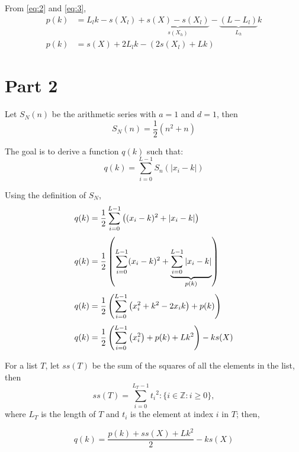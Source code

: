 \documentclass[11pt]{article}
\begin{document}
From \eqref{eq:2} and \eqref{eq:3},
\begin{align}
    p(k) & = {
    L_l k - s(X_l) +
    \underbrace{s(X) - s(X_l)}_{s(X_h)} -
    \underbrace{(L - L_l)}_{L_h} k
    } \nonumber \\
    p(k) & =  {
    s(X) + 2 L_l k - (2 s(X_l) + L k)
    \tag{P} \label{eq:p}
    }
\end{align}

\newpage

\section*{Part 2}

Let \(S_N(n)\) be the arithmetic series with \(a = 1\) and \(d = 1\), then
\begin{equation*}
    S_N(n) = \frac{1}{2} \left({n^2 + n}\right)
\end{equation*}


The goal is to derive a function \(q(k)\) such that:
\begin{equation*}
    q(k) = \sum_{i = 0}^{L - 1} S_n(|x_i - k|)
\end{equation*}

Using the definition of \(S_N\),
\begin{equation*}
    \setlength{\jot}{0.5\baselineskip}
    \begin{aligned}
        q(k) & = \frac{1}{2} \sum_{i = 0}^{L - 1}
        \left({(x_i - k)^2 + |x_i - k|}\right)    \\
        q(k) & = \frac{1}{2} \left({
            \sum_{i = 0}^{L - 1} (x_i - k)^2 +
            \underbrace{
                \sum_{i = 0}^{L - 1} |x_i - k|
            }_{p(k)}
        }\right)                                  \\
        q(k) & = \frac{1}{2} \left({
                    \sum_{i = 0}^{L - 1} \left({x_i^2 + k^2 - 2 x_i k}\right) +
                    p(k)
        }\right)                                  \\
        q(k) & = \frac{1}{2} \left({
                    \sum_{i = 0}^{L - 1} \left({x_i^2}\right) +
                    p(k) + L k^2
                }\right) - k s(X)
    \end{aligned}
\end{equation*}

For a list \(T\), let \(ss(T)\) be the sum of the squares of all the elements
in the list, then
\begin{equation*}
    ss(T) = {
    \sum_{i = 0}^{L_T - 1} {t_i}^2: \{i \in \mathbb{Z}:
    i \geqslant 0\} {,}
    }
\end{equation*}
where \(L_T\) is the length of \(T\) and \(t_i\) is the element at index \(i\)
in \(T\); then,

\begin{equation*}
    q(k) = \frac{p(k) + ss(X) + L k^2}{2} - k s(X)
    \tag{Q} \label{eq:q}
\end{equation*}
\end{document}
